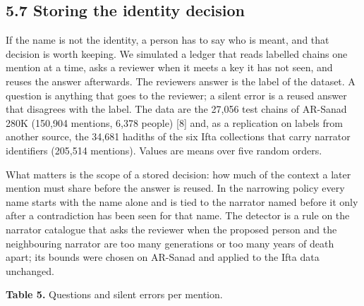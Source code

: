 \documentclass[
  english,
]{article}
\begin{document}
\subsection{5.7 Storing the identity
decision}\label{storing-the-identity-decision}

If the name is not the identity, a person has to say who is meant, and
that decision is worth keeping. We simulated a ledger that reads
labelled chains one mention at a time, asks a reviewer when it meets a
key it has not seen, and reuses the answer afterwards. The
reviewer\textquotesingle s answer is the label of the dataset. A
question is anything that goes to the reviewer; a silent error is a
reused answer that disagrees with the label. The data are the 27,056
test chains of AR-Sanad 280K (150,904 mentions, 6,378 people) {[}8{]}
and, as a replication on labels from another source, the 34,681 hadiths
of the six Ifta collections that carry narrator identifiers (205,514
mentions). Values are means over five random orders.

What matters is the scope of a stored decision: how much of the context
a later mention must share before the answer is reused. In the narrowing
policy every name starts with the name alone and is tied to the narrator
named before it only after a contradiction has been seen for that name.
The detector is a rule on the narrator catalogue that asks the reviewer
when the proposed person and the neighbouring narrator are too many
generations or too many years of death apart; its bounds were chosen on
AR-Sanad and applied to the Ifta data unchanged.

\textbf{Table 5.} Questions and silent errors per mention.
\end{document}
